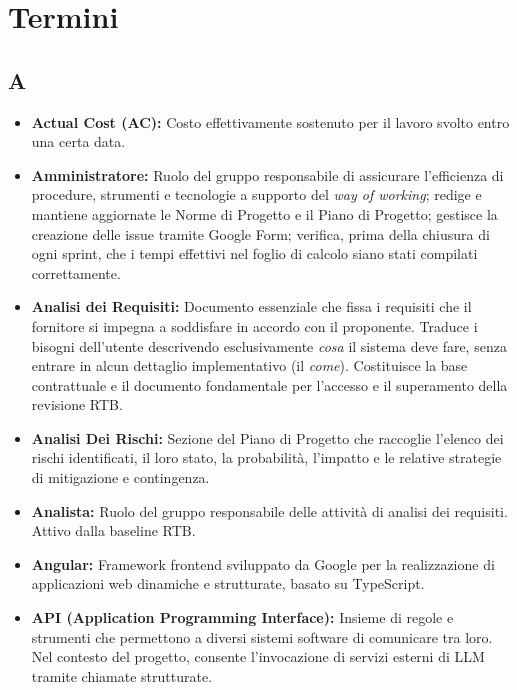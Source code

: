 \section{Termini}
 
{}
\subsection*{A}
\begin{itemize}[leftmargin=*]
      \item \textbf{Actual Cost (AC):} Costo effettivamente sostenuto per il lavoro 
      svolto entro una certa data.
      \item \textbf{Amministratore:} Ruolo del gruppo responsabile di assicurare
      l'efficienza di procedure, strumenti e tecnologie a supporto del
      \textit{way of working}; redige e mantiene aggiornate le Norme di
      Progetto e il Piano di Progetto; gestisce la creazione delle issue tramite Google Form; verifica,
      prima della chiusura di ogni sprint, che i tempi effettivi nel foglio di
      calcolo siano stati compilati correttamente.
      \item \textbf{Analisi dei Requisiti:} Documento essenziale che fissa i requisiti che il fornitore si impegna a soddisfare in accordo con il proponente. Traduce i bisogni dell'utente descrivendo esclusivamente \textit{cosa} il sistema deve fare, senza entrare in alcun dettaglio implementativo (il \textit{come}). Costituisce la base contrattuale e il documento fondamentale per l'accesso e il superamento della revisione RTB.
      \item \textbf{Analisi Dei Rischi:} Sezione del Piano di Progetto che raccoglie l'elenco dei rischi identificati, il loro stato, la probabilità, l'impatto e le relative strategie di mitigazione e contingenza.
      \item \textbf{Analista:} Ruolo del gruppo responsabile delle attività di
      analisi dei requisiti. Attivo dalla baseline RTB.
      \item \textbf{Angular:} Framework frontend sviluppato da Google per la realizzazione di applicazioni web dinamiche e strutturate, basato su TypeScript.
      \item \textbf{API (Application Programming Interface):} Insieme di regole e strumenti che permettono a diversi sistemi software di comunicare tra loro. Nel contesto del progetto, consente l'invocazione di servizi esterni di LLM tramite chiamate strutturate.

\end{itemize}
